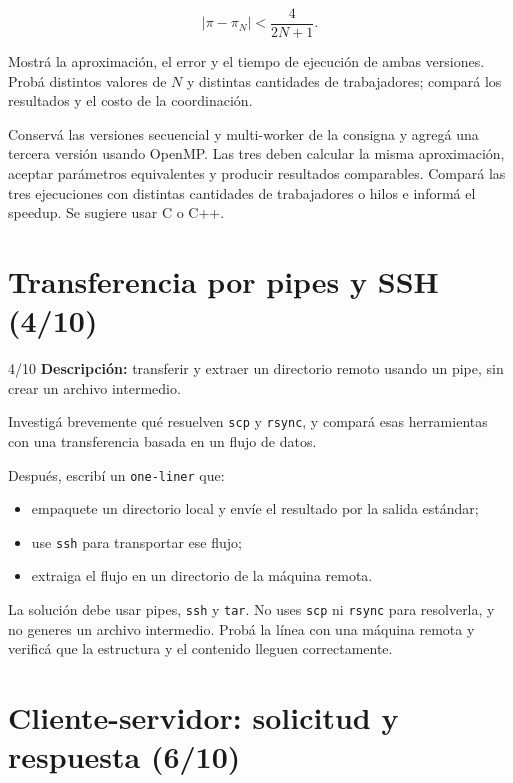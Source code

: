 \documentclass[11pt,a4paper]{article}
\begin{document}
\[
\left|\pi - \pi_N\right| < \frac{4}{2N+1}.
\]

Mostrá la aproximación, el error y el tiempo de ejecución de ambas versiones.
Probá distintos valores de $N$ y distintas cantidades de trabajadores;
compará los resultados y el costo de la coordinación.

\begin{bonusbox}
Conservá las versiones secuencial y multi-worker de la consigna y agregá una
tercera versión usando OpenMP. Las tres deben calcular la misma aproximación,
aceptar parámetros equivalentes y producir resultados comparables. Compará
las tres ejecuciones con distintas cantidades de trabajadores o hilos e
informá el speedup. Se sugiere usar C o C++.
\end{bonusbox}

\newpage
\section{Transferencia por pipes y SSH (4/10)}

\begin{trackbox}{4/10}
\textbf{Descripción:} transferir y extraer un directorio remoto usando un
pipe, sin crear un archivo intermedio.
\end{trackbox}

Investigá brevemente qué resuelven \texttt{scp} y \texttt{rsync}, y compará
esas herramientas con una transferencia basada en un flujo de datos.

Después, escribí un \texttt{one-liner} que:

\begin{itemize}
  \item empaquete un directorio local y envíe el resultado por la salida
  estándar;
  \item use \texttt{ssh} para transportar ese flujo;
  \item extraiga el flujo en un directorio de la máquina remota.
\end{itemize}

La solución debe usar pipes, \texttt{ssh} y \texttt{tar}. No uses
\texttt{scp} ni \texttt{rsync} para resolverla, y no generes un archivo
intermedio. Probá la línea con una máquina remota y verificá que la estructura
y el contenido lleguen correctamente.

\newpage
\section{Cliente-servidor: solicitud y respuesta (6/10)}
\end{document}
